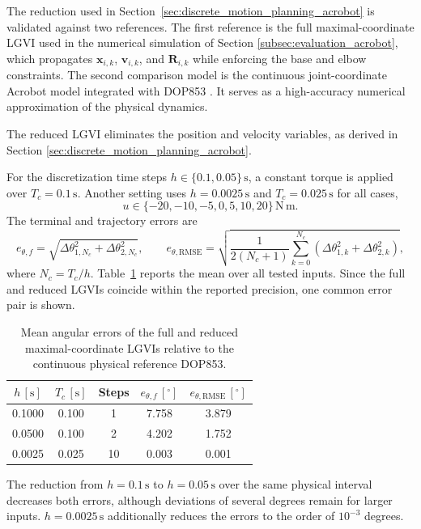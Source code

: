 The reduction used in Section~\ref{sec:discrete_motion_planning_acrobot} is
validated against two references. The first reference is the full
maximal-coordinate LGVI used in the numerical simulation of Section \ref{subsec:evaluation_acrobot},
which propagates
\(\bm{x}_{i,k}\), \(\bm{v}_{i,k}\), and \(\bm{R}_{i,k}\) while enforcing the base and elbow
constraints. The second comparison model is the continuous joint-coordinate Acrobot model integrated 
with DOP853 \cite{HairerNorsettWanner1993}. It serves as a high-accuracy numerical approximation of the
physical dynamics.

The reduced LGVI eliminates the position and velocity variables,
as derived in Section \ref{sec:discrete_motion_planning_acrobot}. 

For the discretization time steps \(h\in\{0.1,0.05\}\,\mathrm{s}\), a constant
torque is applied over \(T_c=0.1\,\mathrm{s}\). Another setting
uses \(h=0.0025\,\mathrm{s}\) and \(T_c=0.025\,\mathrm{s}\) for all cases,
\[
u\in\{-20,-10,-5,0,5,10,20\}\,\mathrm{N\,m}.
\]
The terminal and trajectory errors are
\begin{equation}
e_{\theta,f}=
\sqrt{\Delta\theta_{1,N_c}^{2}+\Delta\theta_{2,N_c}^{2}},
\qquad
e_{\theta,\mathrm{RMSE}}=
\sqrt{\frac{1}{2(N_c+1)}
\sum_{k=0}^{N_c}
\left(\Delta\theta_{1,k}^{2}+\Delta\theta_{2,k}^{2}\right)},
\label{eq:app_acrobot_validation_errors}
\end{equation}
where \(N_c=T_c/h\). Table~\ref{tab:app_acrobot_validation_steps} reports the
mean over all tested inputs. Since the full and reduced LGVIs coincide within
the reported precision, one common error pair is shown.

\begin{table}[ht]
\centering
\caption{Mean angular errors of the full and reduced maximal-coordinate LGVIs
relative to the continuous physical reference DOP853.}
\label{tab:app_acrobot_validation_steps}
\small
\begin{tabular}{ccccc}
\hline
\(h\,[\mathrm{s}]\) & \(T_c\,[\mathrm{s}]\) & Steps &
\(e_{\theta,f}\,[{}^\circ]\) &
\(e_{\theta,\mathrm{RMSE}}\,[{}^\circ]\)\\
\hline
0.1000 & 0.100 & 1  & 7.758 & 3.879\\
0.0500 & 0.100 & 2  & 4.202 & 1.752\\
0.0025 & 0.025 & 10 & 0.003 & 0.001\\
\hline
\end{tabular}
\end{table}

The reduction from \(h=0.1\,\mathrm{s}\) to \(h=0.05\,\mathrm{s}\) over the
same physical interval decreases both errors, although deviations of several
degrees remain for larger inputs. \(h=0.0025\,\mathrm{s}\) additionally 
reduces the errors to the order of \(10^{-3}\) degrees.

